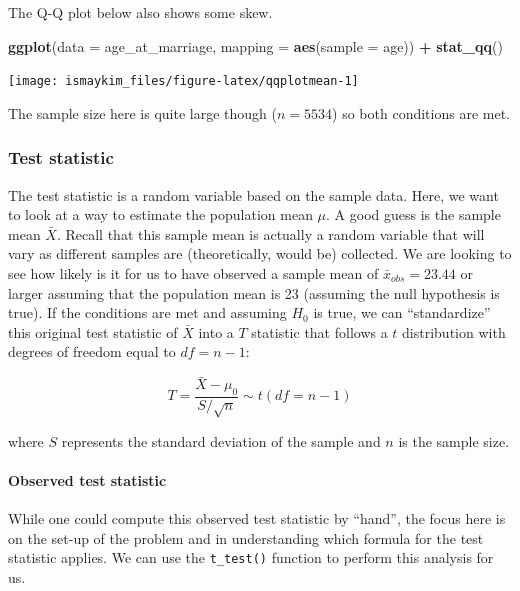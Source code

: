 \documentclass[12pt,]{krantz}
\makeatletter
\newenvironment{Shaded}{\begin{snugshade}}{\end{snugshade}}
\newcommand{\KeywordTok}[1]{\textcolor[rgb]{0.27,0.27,0.27}{\textbf{#1}}}
\newcommand{\DataTypeTok}[1]{\textcolor[rgb]{0.27,0.27,0.27}{#1}}
\newcommand{\StringTok}[1]{\textcolor[rgb]{0.5,0.5,0.5}{#1}}
\newcommand{\OperatorTok}[1]{\textcolor[rgb]{0.43,0.43,0.43}{\textbf{#1}}}
\newcommand{\NormalTok}[1]{#1}
\let\oldparagraph\paragraph
\renewcommand{\paragraph}[1]{\oldparagraph{#1}\mbox{}}
\newenvironment{kframe}{%
\medskip{}
\setlength{\fboxsep}{.8em}
 \def\at@end@of@kframe{}%
 \ifinner\ifhmode%
  \def\at@end@of@kframe{\end{minipage}}%
  \begin{minipage}{\columnwidth}%
 \fi\fi%
 \def\FrameCommand##1{\hskip\@totalleftmargin \hskip-\fboxsep
 \colorbox{shadecolor}{##1}\hskip-\fboxsep
     \hskip-\linewidth \hskip-\@totalleftmargin \hskip\columnwidth}%
 \MakeFramed {\advance\hsize-\width
   \@totalleftmargin\z@ \linewidth\hsize
   \@setminipage}}%
 {\par\unskip\endMakeFramed%
 \at@end@of@kframe}
\renewenvironment{Shaded}{\begin{kframe}}{\end{kframe}}
\makeatother
\begin{document}
The Q-Q plot below also shows some skew.

\begin{Shaded}
\begin{Highlighting}[]
\KeywordTok{ggplot}\NormalTok{(}\DataTypeTok{data =}\NormalTok{ age_at_marriage, }\DataTypeTok{mapping =} \KeywordTok{aes}\NormalTok{(}\DataTypeTok{sample =}\NormalTok{ age)) }\OperatorTok{+}
\StringTok{  }\KeywordTok{stat_qq}\NormalTok{()}
\end{Highlighting}
\end{Shaded}

\begin{center}\texttt{[image: ismaykim\_files/figure-latex/qqplotmean-1]} \end{center}

The sample size here is quite large though (\(n = 5534\)) so both
conditions are met.

\subsubsection*{Test statistic}\label{test-statistic}


The test statistic is a random variable based on the sample data. Here,
we want to look at a way to estimate the population mean \(\mu\). A good
guess is the sample mean \(\bar{X}\). Recall that this sample mean is
actually a random variable that will vary as different samples are
(theoretically, would be) collected. We are looking to see how likely is
it for us to have observed a sample mean of \(\bar{x}_{obs} = 23.44\) or
larger assuming that the population mean is 23 (assuming the null
hypothesis is true). If the conditions are met and assuming \(H_0\) is
true, we can ``standardize'' this original test statistic of \(\bar{X}\)
into a \(T\) statistic that follows a \(t\) distribution with degrees of
freedom equal to \(df = n - 1\):

\[ T =\dfrac{ \bar{X} - \mu_0}{ S / \sqrt{n} } \sim t (df = n - 1) \]

where \(S\) represents the standard deviation of the sample and \(n\) is
the sample size.

\paragraph{Observed test statistic}\label{observed-test-statistic}

While one could compute this observed test statistic by ``hand'', the
focus here is on the set-up of the problem and in understanding which
formula for the test statistic applies. We can use the
\texttt{t\_test()} function to perform this analysis for us.
\end{document}
